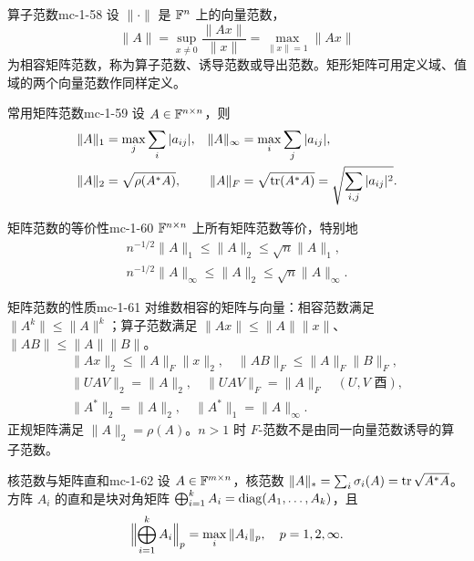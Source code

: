 \begin{lemma}{算子范数}{mc-1-58}
设 $\|\cdot\|$ 是 $\mathbb{F}^n$ 上的向量范数，
\[\|A\|=\sup_{x\ne0}\frac{\|Ax\|}{\|x\|}=\max_{\|x\|=1}\|Ax\|\]
为相容矩阵范数，称为算子范数、诱导范数或导出范数。矩形矩阵可用定义域、值域的两个向量范数作同样定义。
\end{lemma}

\begin{lemma}{常用矩阵范数}{mc-1-59}
设 $A\in\mathbb{F}^{n\times n}$，则
\[
\begin{aligned}
\|A\|_1&=\max_j\sum_i|a_{ij}|,&\|A\|_\infty&=\max_i\sum_j|a_{ij}|,\\
\|A\|_2&=\sqrt{\rho(A^*A)},&\|A\|_F&=\sqrt{\operatorname{tr}(A^*A)}=\sqrt{\sum_{i,j}|a_{ij}|^2}.
\end{aligned}
\]
\end{lemma}

\begin{theorem}{矩阵范数的等价性}{mc-1-60}
$\mathbb{F}^{n\times n}$ 上所有矩阵范数等价，特别地
\[
\begin{gathered}
n^{-1/2}\|A\|_1\leq\|A\|_2\leq\sqrt n\|A\|_1,\\
n^{-1/2}\|A\|_\infty\leq\|A\|_2\leq\sqrt n\|A\|_\infty.
\end{gathered}
\]
\end{theorem}

\begin{proposition}{矩阵范数的性质}{mc-1-61}
对维数相容的矩阵与向量：相容范数满足 $\|A^k\|\leq\|A\|^k$；算子范数满足 $\|Ax\|\leq\|A\|\|x\|$、$\|AB\|\leq\|A\|\|B\|$。
\[
\begin{gathered}
\|Ax\|_2\leq\|A\|_F\|x\|_2,\quad\|AB\|_F\leq\|A\|_F\|B\|_F,\\
\|UAV\|_2=\|A\|_2,\quad\|UAV\|_F=\|A\|_F\quad(U,V\text{ 酉}),\\
\|A^*\|_2=\|A\|_2,\quad\|A^*\|_1=\|A\|_\infty.
\end{gathered}
\]
正规矩阵满足 $\|A\|_2=\rho(A)$。$n>1$ 时 $F$-范数不是由同一向量范数诱导的算子范数。
\end{proposition}

\begin{definition}{核范数与矩阵直和}{mc-1-62}
设 $A\in\mathbb{F}^{m\times n}$，核范数 $\|A\|_* =\sum_i\sigma_i(A)=\operatorname{tr}\sqrt{A^*A}$。方阵 $A_i$ 的直和是块对角矩阵 $\bigoplus_{i=1}^kA_i=\operatorname{diag}(A_1,\ldots,A_k)$，且
\[\Bigl\|\bigoplus_{i=1}^kA_i\Bigr\|_p=\max_i\|A_i\|_p,\quad p=1,2,\infty.\]
\end{definition}

